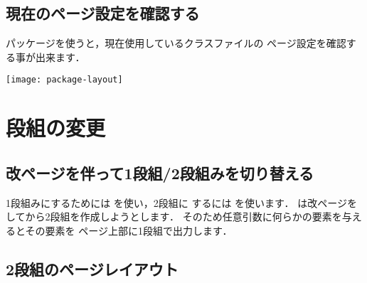 \subsection{現在のページ設定を確認する}
\begin{usage}
\usepackage{layout}
\layout
\end{usage}
パッケージを使うと，現在使用しているクラスファイルの
ページ設定を確認する事が出来ます．
\begin{outonly}
{\centering\texttt{[image: package-layout]}}
\end{outonly}

\section{段組の変更}

\subsection{改ページを伴って1段組/2段組みを切り替える}
\begin{usage}
\onecolumn %
\twocolumn[$\<段落要素>$] %
\end{usage}
1段組みにするためには を使い，2段組に
するには を使います．
は改ページをしてから2段組を作成しようとします．
そのため任意引数に何らかの要素を与えるとその要素を
ページ上部に1段組で出力します．


\subsection{2段組のページレイアウト}

